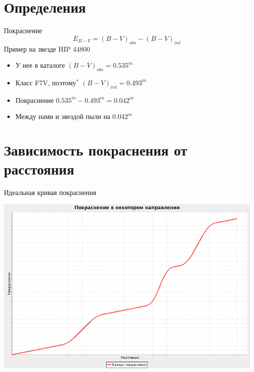 \documentclass[14pt, fleqn, xcolor={dvipsnames, table}]{beamer}
\begin{document}
    \section{Определения}
        \begin{frame}{Покраснение}
            $$
                E_{B - V} = (B - V)_{obs} - (B - V)_{int}
            $$
            Пример на звезде HIP 44800
            \begin{itemize}
                \item У нее в каталоге $(B - V)_{obs} = 0.535^m$
                \item Класс F7V, поэтому$^*$ $(B - V)_{int} = 0.493^m$
                \item Покраснение $0.535^m - 0.493^m = 0.042^m$
                \item Между нами и звездой пыли на $0.042^m$
            \end{itemize}
        \end{frame}

    \section{Зависимость покраснения от расстояния}    
    
        \begin{frame}{Идеальная кривая покраснения}
            \begin{center}
                \includegraphics[scale=0.35]{ideal-1-no-tick.png}
            \end{center}             
        \end{frame}
        
\end{document}

